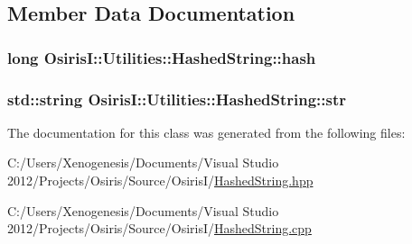 \subsection{Member Data Documentation}
\hypertarget{class_osiris_i_1_1_utilities_1_1_hashed_string_a9bee254c6edce12abaaf0117747f5d03}{
\subsubsection[{hash}]{\setlength{\rightskip}{0pt plus 5cm}long Osiris\-I\-::\-Utilities\-::\-Hashed\-String\-::hash\hspace{0.3cm}{\ttfamily [protected]}}}\label{class_osiris_i_1_1_utilities_1_1_hashed_string_a9bee254c6edce12abaaf0117747f5d03}
\hypertarget{class_osiris_i_1_1_utilities_1_1_hashed_string_aae46768ab3a0edcf99192458e3bf0046}{
\subsubsection[{str}]{\setlength{\rightskip}{0pt plus 5cm}std\-::string Osiris\-I\-::\-Utilities\-::\-Hashed\-String\-::str\hspace{0.3cm}{\ttfamily [protected]}}}\label{class_osiris_i_1_1_utilities_1_1_hashed_string_aae46768ab3a0edcf99192458e3bf0046}


The documentation for this class was generated from the following files\-:\begin{DoxyCompactItemize}
\item 
C\-:/\-Users/\-Xenogenesis/\-Documents/\-Visual Studio 2012/\-Projects/\-Osiris/\-Source/\-Osiris\-I/\hyperlink{_hashed_string_8hpp}{Hashed\-String.\-hpp}\item 
C\-:/\-Users/\-Xenogenesis/\-Documents/\-Visual Studio 2012/\-Projects/\-Osiris/\-Source/\-Osiris\-I/\hyperlink{_hashed_string_8cpp}{Hashed\-String.\-cpp}\end{DoxyCompactItemize}
